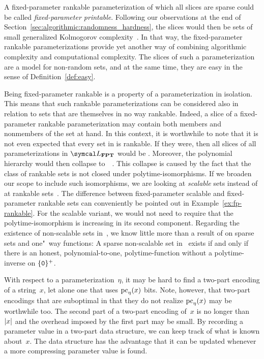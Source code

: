 A fixed-parameter \pdash{}rankable parameterization of which all slices are sparse could be called \emph{fixed-parameter \pdash{}printable}.
Following our observations at the end of Section~\ref{sec:algorithmic:randomness_hardness}, the slices would then be sets of small generalized Kolmogorov complexity~\parencite{allender1988p-printable}.
In that way, the fixed-parameter \pdash{}rankable parameterizations provide yet another way of combining algorithmic complexity and computational complexity.
The slices of such a parameterization are a model for non-random sets, and at the same time, they are easy in the sense of Definition~\ref{def:easy}.

Being fixed-parameter \pdash{}rankable is a property of a parameterization in isolation.
This means that such rankable parameterizations can be considered also in relation to sets that are themselves in no way \pdash{}rankable.
Indeed, a slice of a fixed-parameter \pdash{}rankable parameterization may contain both members and nonmembers of the set at hand.
In this context, it is worthwhile to note that it is not even expected that every set in  is \pdash{}rankable.
If they were, then all slices of all parameterizations in $\calL_\cl{FPT}$ would be .
Moreover, the polynomial hierarchy would then collapse to~~\parencite{hemachandra1990complexity}.
This collapse is caused by the fact that the class of rankable sets is not closed under polytime-isomorphisms.
If we broaden our scope to include such isomorphisms, we are looking at \emph{scalable} sets instead of at rankable sets~\parencite{goldsmith1996scalability}.
The difference between fixed-parameter scalable and fixed-parameter \pdash{}rankable sets can conveniently be pointed out in Example~\ref{ex:fp-rankable}.
For the scalable variant, we would not need to require that the polytime-isomorphism is increasing in its second component.
Regarding the existence of non-scalable sets in~, we know little more than a result of \textcite{allender1986complexity} on sparse sets and one"~way functions:
A sparse non-scalable set in~ exists if and only if there is an honest, polynomial-to-one, polytime-function without a polytime-inverse on $\{\textnormal{\texttt{0}}\}^+$.

With respect to a parameterization~$\eta$, it may be hard to find a two-part encoding of a string~$x$, let alone one that uses $\operatorname{pc}_\eta(x)$ bits.
Note, however, that two-part encodings that are suboptimal in that they do not realize $\operatorname{pc}_\eta(x)$ may be worthwhile too.
The second part of a two-part encoding of~$x$ is no longer than~${\lvert x\rvert}$ and the overhead imposed by the first part may be small.
By recording a parameter value in a two-part data structure, we can keep track of what is known about~$x$.
The data structure has the advantage that it can be updated whenever a more compressing parameter value is found.

